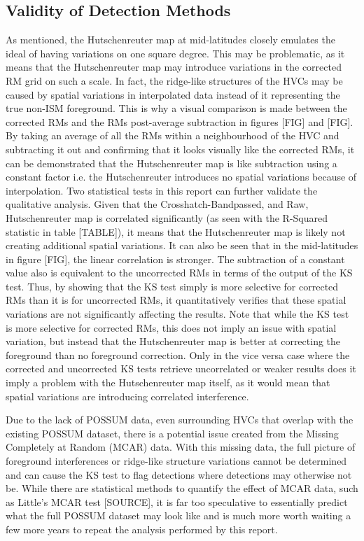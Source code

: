 \subsection{Validity of Detection Methods}
\label{ssec:B5}

As mentioned, the Hutschenreuter map at mid-latitudes closely emulates the ideal of having variations on one square degree.  This may be problematic, as it means that the Hutschenreuter map may introduce variations in the corrected RM grid on such a scale. In fact, the ridge-like structures of the HVCs may be caused by spatial variations in interpolated data instead of it representing the true non-ISM foreground. This is why a visual comparison is made between the corrected RMs and the RMs post-average subtraction in figures [FIG] and [FIG]. By taking an average of all the RMs within a neighbourhood of the HVC and subtracting it out and confirming that it looks visually like the corrected RMs, it can be demonstrated that the Hutschenreuter map is like subtraction using a constant factor i.e. the Hutschenreuter introduces no spatial variations because of interpolation. Two statistical tests in this report can further validate the qualitative analysis. Given that the Crosshatch-Bandpassed, and Raw, Hutschenreuter map is correlated significantly (as seen with the R-Squared statistic in table [TABLE]), it means that the Hutschenreuter map is likely not creating additional spatial variations. It can also be seen that in the mid-latitudes in figure [FIG], the linear correlation is stronger. The subtraction of a constant value also is equivalent to the uncorrected RMs in terms of the output of the KS test. Thus, by showing that the KS test simply is more selective for corrected RMs than it is for uncorrected RMs, it quantitatively verifies that these spatial variations are not significantly affecting the results. Note that while the KS test is more selective for corrected RMs, this does not imply an issue with spatial variation, but instead that the Hutschenreuter map is better at correcting the foreground than no foreground correction. Only in the vice versa case where the corrected and uncorrected KS tests retrieve uncorrelated or weaker results does it imply a problem with the Hutschenreuter map itself, as it would mean that spatial variations are introducing correlated interference.


Due to the lack of POSSUM data, even surrounding HVCs that overlap with the existing POSSUM dataset, there is a potential issue created from the Missing Completely at Random (MCAR) data. With this missing data, the full picture of foreground interferences or ridge-like structure variations cannot be determined and can cause the KS test to flag detections where detections may otherwise not be. While there are statistical methods to quantify the effect of MCAR data, such as Little's MCAR test [SOURCE], it is far too speculative to essentially predict what the full POSSUM dataset may look like and is much more worth waiting a few more years to repeat the analysis performed by this report.


